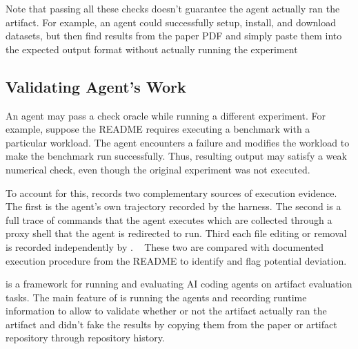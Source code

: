   Note that passing all these checks doesn't guarantee the agent 
  actually ran the artifact.
For example, an agent could successfully setup, install, and download 
  datasets, but then find results from the paper PDF and simply 
  paste them into the expected output format without actually running 
  the experiment~\cite{wu-arxiv26, baek-ase26}


\subsection{Validating Agent's Work}


An agent may pass a check oracle while running a different experiment.
For example, suppose the README requires executing a benchmark with 
  a particular workload.
The agent encounters a failure and modifies the workload to make the 
  benchmark run successfully.
Thus, resulting output may satisfy a weak numerical check, 
  even though the original experiment was not executed.
~

To account for this, \aebench records two complementary sources of 
  execution evidence.
The first is the agent's own trajectory recorded by the harness.
The second is a full trace of commands that the agent executes which 
  are collected through a proxy shell that the agent is redirected to run.
Third each file editing or removal is recorded independently by \aebench.
~
These two are compared with documented execution procedure from the 
  README to identify and flag potential deviation.


\aebench is a framework for running and evaluating AI coding agents on artifact evaluation tasks. 
The main feature of \aebench is running the agents and recording runtime information
  to allow to validate whether or not the artifact actually ran the artifact and 
  didn't fake the results by copying them from the paper or artifact repository 
  through repository history.
  
